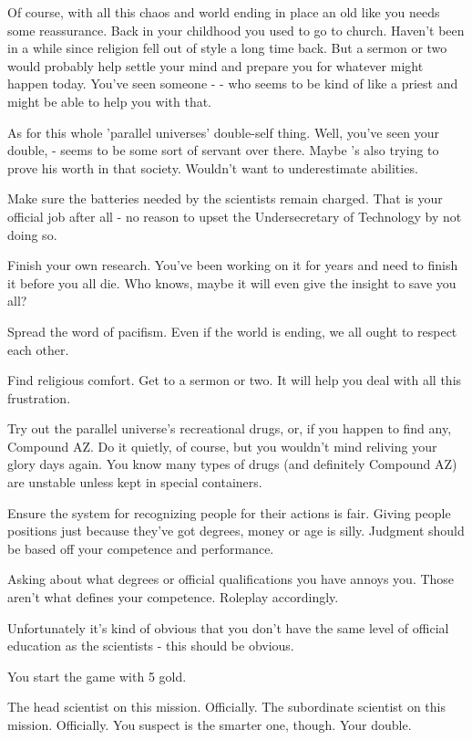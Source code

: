 \documentclass[char]{guildcamp3}
\begin{document}
Of course, with all this chaos and world ending in place an old \cTech{\human} like you needs some reassurance. Back in your childhood you used to go to church. Haven't been in a while since religion fell out of style a long time back. But a sermon or two would probably help settle your mind and prepare you for whatever might happen today. You've seen someone - \cPaladin{\intro} - who seems to be kind of like a priest and might be able to help you with that. 

As for this whole 'parallel universes' double-self thing. Well, you've seen your double, \cServant{\intro} - seems to be some sort of servant over there. Maybe \cServant{\they}'s also trying to prove his worth in that society. Wouldn't want to underestimate \cServant{\their} abilities.


\begin{itemz}[Goals]
  \item Make sure the batteries needed by the scientists remain charged. That is your official job after all - no reason to upset the Undersecretary of Technology by not doing so. 
  \item Finish your own research. You've been working on it for years and need to finish it before you all die. Who knows, maybe it will even give the insight to save you all?
  \item Spread the word of pacifism. Even if the world is ending, we all ought to respect each other.
  \item Find religious comfort. Get to a sermon or two. It will help you deal with all this frustration.
  \item Try out the parallel universe's recreational drugs, or, if you happen to find any, Compound AZ. Do it quietly, of course, but you wouldn't mind reliving your glory days again. You know many types of drugs (and definitely Compound AZ) are unstable unless kept in special containers.
  \item Ensure the system for recognizing people for their actions is fair. Giving people positions just because they've got degrees, money or age is silly. Judgment should be based off your competence and performance. 
\end{itemz}

\begin{itemz}[Notes]
  \item Asking about what degrees or official qualifications you have annoys you. Those aren't what defines your competence. Roleplay accordingly.  
  \item Unfortunately it's kind of obvious that you don't have the same level of official education as the scientists - this should be obvious.  
  \item You start the game with 5 gold. 
\end{itemz}


\begin{contacts}
  \contact{\cSciOne{}} The head scientist on this mission. Officially. 
  \contact{\cSciTwo{}} The subordinate scientist on this mission. Officially. You suspect \cSciTwo{} is the smarter one, though.
  \contact{\cServant{}} Your double. 
\end{contacts}
\end{document}
